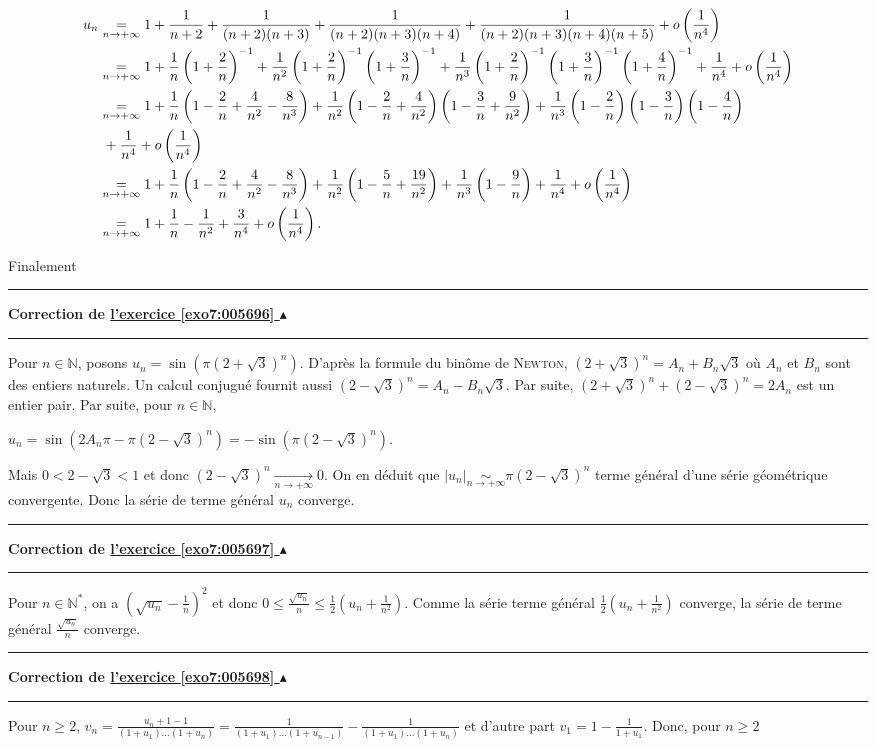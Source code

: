 \documentclass[11pt,a4paper]{article}
\newcommand{\Nn}{\mathbb{N}} \newcommand{\N}{\mathbb{N}}
\newcounter{exo}
\newcommand{\correction}[1]{\hypertarget{cor7:#1}{}\label{cor7:#1}{\bf Correction de \hyperlink{exo7:#1}{l'exercice \ref{exo7:#1} $\blacktriangle$}}\vspace{1mm}\hrule\vspace{1mm}}
\newcommand{\fincorrection}{\vspace{1mm}\hrule\vspace*{7mm}}
\begin{document}
\begin{align*}\ensuremath
u_n&\underset{n\rightarrow+\infty}{=}1+\frac{1}{n+2}+\frac{1}{(n+2)(n+3)}+\frac{1}{(n+2)(n+3)(n+4)}+\frac{1}{(n+2)(n+3)(n+4)(n+5)}+o\left(\frac{1}{n^4}\right)\\
 &\underset{n\rightarrow+\infty}{=}1+\frac{1}{n}\left(1+\frac{2}{n}\right)^{-1}+\frac{1}{n^2}\left(1+\frac{2}{n}\right)^{-1}\left(1+\frac{3}{n}\right)^{-1}+\frac{1}{n^3}\left(1+\frac{2}{n}\right)^{-1}\left(1+\frac{3}{n}\right)^{-1}\left(1+\frac{4}{n}\right)^{-1}+\frac{1}{n^4}+o\left(\frac{1}{n^4}\right)\\
  &\underset{n\rightarrow+\infty}{=}1+\frac{1}{n}\left(1-\frac{2}{n}+\frac{4}{n^2}-\frac{8}{n^3}\right)+\frac{1}{n^2}\left(1-\frac{2}{n}+\frac{4}{n^2}\right)\left(1-\frac{3}{n}+\frac{9}{n^2}\right)+\frac{1}{n^3}\left(1-\frac{2}{n}\right)\left(1-\frac{3}{n}\right)\left(1-\frac{4}{n}\right)\\
  &\;+\frac{1}{n^4}+o\left(\frac{1}{n^4}\right)\\
  &\underset{n\rightarrow+\infty}{=}1+\frac{1}{n}\left(1-\frac{2}{n}+\frac{4}{n^2}-\frac{8}{n^3}\right)+\frac{1}{n^2}\left(1-\frac{5}{n}+\frac{19}{n^2}\right)+\frac{1}{n^3}\left(1-\frac{9}{n}\right)+\frac{1}{n^4}+o\left(\frac{1}{n^4}\right)\\
  &\underset{n\rightarrow+\infty}{=}1+\frac{1}{n}-\frac{1}{n^2}+\frac{3}{n^4}+o\left(\frac{1}{n^4}\right).
\end{align*}

Finalement

\begin{center}
\end{center}
\fincorrection
\correction{005696}
 Pour $n\in\Nn$, posons $u_n=\sin\left(\pi(2+\sqrt{3})^n\right)$. D'après la formule du binôme de \textsc{Newton}, $(2+\sqrt{3})^n=A_n +B_n\sqrt{3}$ où $A_n$ et $B_n$ sont des entiers naturels. Un calcul conjugué fournit aussi $(2-\sqrt{3})^n=A_n-B_n\sqrt{3}$. Par suite, $(2+\sqrt{3})^n+(2-\sqrt{3})^n= 2A_n$ est un entier pair. Par suite, pour $n\in\Nn$,

\begin{center}
$u_n =\sin\left(2A_n\pi-\pi(2-\sqrt{3})^n\right)=-\sin\left(\pi(2-\sqrt{3})^n\right)$.
\end{center}

Mais $0< 2-\sqrt{3}< 1$ et donc $(2-\sqrt{3})^n\underset{n\rightarrow+\infty}{\rightarrow}0$. On en déduit que $|u_n|\underset{n\rightarrow+\infty}{\sim}\pi(2-\sqrt{3})^n$ terme général d'une série géométrique convergente. Donc la série de terme général $u_n$ converge.
\fincorrection
\correction{005697}
Pour $n\in\Nn^*$, on a $\left(\sqrt{u_n}-\frac{1}{n}\right)^2$ et donc $0\leqslant\frac{\sqrt{u_n}}{n}\leqslant\frac{1}{2}\left(u_n+\frac{1}{n^2}\right)$. Comme la série terme général $\frac{1}{2}\left(u_n+\frac{1}{n^2}\right)$ converge, la série de terme général $\frac{\sqrt{u_n}}{n}$  converge.
\fincorrection
\correction{005698}
 Pour $n\geqslant2$, $v_n=\frac{u_n+1-1}{(1+u_1)\ldots(1+u_n)}=\frac{1}{(1+u_1)\ldots(1+u_{n-1})}-\frac{1}{(1+u_1)\ldots(1+u_n)}$  et d'autre part $v_1=1-\frac{1}{1+u_1}$. Donc, pour $n\geqslant2$
\end{document}
